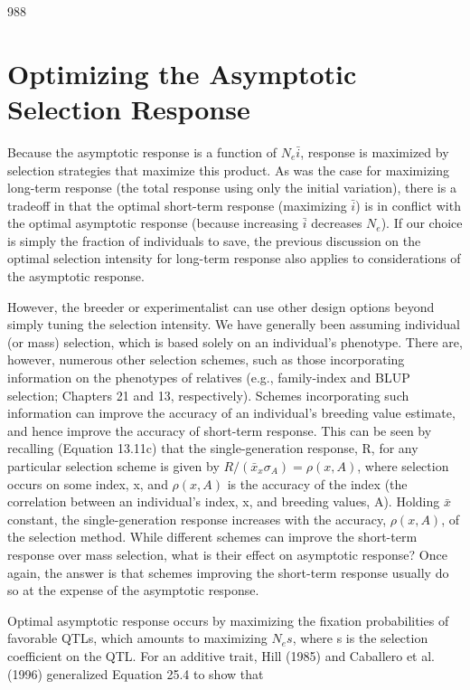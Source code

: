 \documentclass{article}
\begin{document}
{988

\section{Optimizing the Asymptotic Selection Response}
Because the asymptotic response is a function of  $ N_e\bar{i} $, response is maximized by selection strategies that maximize this product. As was the case for maximizing long-term response (the total response using only the initial variation), there is a tradeoff in that the optimal short-term response (maximizing  $ \bar{i} $) is in conflict with the optimal asymptotic response (because increasing  $ \bar{i} $ decreases  $ N_e $). If our choice is simply the fraction of individuals to save, the previous discussion on the optimal selection intensity for long-term response also applies to considerations of the asymptotic response.

However, the breeder or experimentalist can use other design options beyond simply tuning the selection intensity. We have generally been assuming individual (or mass) selection, which is based solely on an individual's phenotype. There are, however, numerous other selection schemes, such as those incorporating information on the phenotypes of relatives (e.g., family-index and BLUP selection; Chapters 21 and 13, respectively). Schemes incorporating such information can improve the accuracy of an individual's breeding value estimate, and hence improve the accuracy of short-term response. This can be seen by recalling (Equation 13.11c) that the single-generation response, R, for any particular selection scheme is given by  $ R/(\bar{x}_{x}\sigma_{A})=\rho(x,A) $, where selection occurs on some index, x, and  $ \rho(x,A) $ is the accuracy of the index (the correlation between an individual's index, x, and breeding values, A). Holding  $ \bar{x} $ constant, the single-generation response increases with the accuracy,  $ \rho(x,A) $, of the selection method. While different schemes can improve the short-term response over mass selection, what is their effect on asymptotic response? Once again, the answer is that schemes improving the short-term response usually do so at the expense of the asymptotic response.

Optimal asymptotic response occurs by maximizing the fixation probabilities of favorable QTLs, which amounts to maximizing  $ N_{e}s $, where s is the selection coefficient on the QTL. For an additive trait, Hill (1985) and Caballero et al. (1996) generalized Equation 25.4 to show that

}
\end{document}
